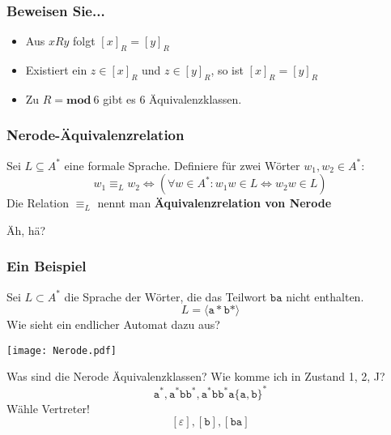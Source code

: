 \begin{frame}
	\frametitle{Beweisen Sie...}
	\begin{itemize}
		\item Aus $xRy$ folgt $[x]_R = [y]_R$
		\item Existiert ein $z \in [x]_R$ und $z \in [y]_R$, so ist $[x]_R = [y]_R$
		\item Zu $R = \textbf{mod} \ 6$ gibt es 6 Äquivalenzklassen.
	\end{itemize}
\end{frame}

\begin{frame}
	\frametitle{Nerode-Äquivalenzrelation}
	\begin{Definition}
		Sei $L \subseteq A^\ast$ eine formale Sprache. Definiere für zwei Wörter $w_1, w_2 \in A^\ast$: $$w_1 \equiv_L w_2 \iff (\forall w \in A^\ast: w_1 w \in L \iff w_2 w \in L)$$
		Die Relation $\equiv_L$ nennt man \textbf{Äquivalenzrelation von Nerode}
	\end{Definition} \pause
	Äh, hä?
\end{frame}

\begin{frame}
	\frametitle{Ein Beispiel}
	Sei $L \subset A^\ast$ die Sprache der Wörter, die das Teilwort $\mathtt{ba}$ nicht enthalten. \pause
	$$L = \langle \mathtt a\ast \mathtt b\ast \rangle$$ Wie sieht ein endlicher Automat dazu aus? \pause 
	\begin{minipage}{0.49\linewidth}\vspace*{1em}
		\centering
		\texttt{[image: Nerode.pdf]}
	\end{minipage}
	\begin{minipage}{0.49\linewidth}
		Was sind die Nerode Äquivalenz\-klassen? \pause
		Wie komme ich in Zustand 1, 2, J? \pause
		$$\mathtt a^\ast, \mathtt a^\ast \mathtt b \mathtt b^\ast, \mathtt a^\ast \mathtt b \mathtt b^\ast \mathtt a \{\mathtt a, \mathtt b\}^\ast $$ \pause
		Wähle Vertreter! $$[\varepsilon], [\mathtt b], [\mathtt{ba}]$$
	\end{minipage}
\end{frame}


